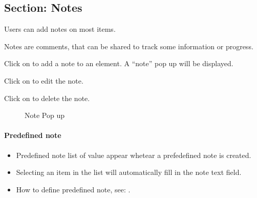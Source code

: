 \documentclass[letterpaper,10pt,english]{sphinxmanual}
\begin{document}

\subsection{Section: Notes}
\label{Gui:index-5}\label{Gui:gui-note-section-label}\label{Gui:section-notes}
Users can add notes on most items.

Notes are comments, that can be shared to track some information or progress.

Click on  to add a note to an element. A “note” pop up will be displayed.

Click on  to edit the note.

Click on  to delete the note.
\begin{figure}[htbp]
\centering
\capstart

\caption{Note Pop up}\end{figure}
\paragraph{Predefined note}
\begin{itemize}
\item {} 
Predefined note list of value appear whetear a prefedefined note is created.

\item {} 
Selecting an item in the list will automatically fill in the note text field.

\item {} 
How to define predefined note, see: {\hyperref[ControlAutomation:ctrlauto-predefined-notes-label]{\emph{}}}.

\end{itemize}
\end{document}
